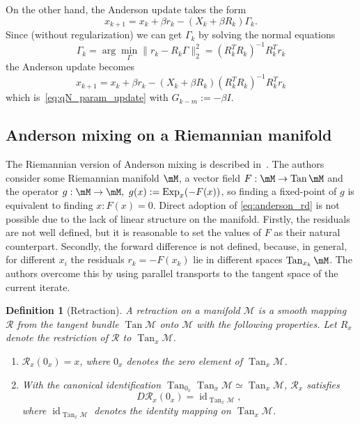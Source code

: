 \documentclass{article} %
\newtheorem{definition}{Definition}[section]
\numberwithin{equation}{subsection}
\numberwithin{theorem}{section}
\newcommand{\cR}{\mathcal{R}}
\newcommand{\rExp}{\operatorname{Exp}}
\begin{document}
    On the other hand, the Anderson update takes the form
    \begin{equation*}
        x_{k+1} = x_k + \beta r_k - (X_k + \beta R_k)\Gamma_k.
    \end{equation*}
    Since (without regularization) we can get $\Gamma_k$ by solving the normal equations
    \[
        \Gamma_k = \arg \min_\Gamma \|r_k - R_k\Gamma\|_2^2 = (R_k^T R_k)^{-1}R_k^T r_k
    \] 
    the Anderson update becomes
    \begin{equation*}
        x_{k+1} = x_k + \beta r_k - (X_k +\beta R_k)(R^T_k R_k)^{-1}R^T_k r_k 
    \end{equation*}
    which is~\eqref{eq:qN_param_update} with $G_{k-m} := - \beta I$.


\subsection{Anderson mixing on a Riemannian manifold}
        The Riemannian version of Anderson mixing is described in~\cite{li2023riemannian}.
        The authors consider some Riemannian manifold $\mM$, a vector field $F: \mM \to \operatorname{Tan}\mM$ and the operator $g: \mM \to \mM,\ g(x) := \rExp_x(-F(x))$, so finding a fixed-point of $g$ is equivalent to finding $x: F(x) = 0$.
        Direct adoption of \eqref{eq:anderson_rd} is not possible due to the lack of linear structure on the manifold.
        Firstly, the residuals are not well defined, but it is reasonable to  set the values of $F$ as their natural counterpart.
        Secondly, the forward difference is not defined, because, in general, for different $x_i$ the residuals $r_k = -F(x_k)$ lie in different spaces $\operatorname{Tan}_{x_k}\mM$.
        The authors overcome this by using parallel transports to the tangent space of the current iterate. 
        \begin{definition}[Retraction]
            A retraction on a manifold $\mathcal{M}$ is a smooth mapping $\cR$ from the tangent bundle $\operatorname{Tan}\mathcal{M}$ onto $\mathcal{M}$ with the following properties. Let $R_x$ denote the restriction of $\cR$ to $\operatorname{Tan}_x\mathcal{M}$.
            \begin{enumerate}
            \item $\cR_x(0_x) = x$, where $0_x$ denotes the zero element of $\operatorname{Tan}_x\mathcal{M}$.
            \item With the canonical identification $\operatorname{Tan}_{0_x}\operatorname{Tan}_x\mathcal{M} \simeq \operatorname{Tan}_x\mathcal{M}$, $\cR_x$ satisfies
            \[
                D \cR_x(0_x) = \operatorname{id}_{\operatorname{Tan}_x\mathcal{M}},
            \]
            where $\operatorname{id}_{\operatorname{Tan}_x\mathcal{M}}$ denotes the identity mapping on $\operatorname{Tan}_x\mathcal{M}$.
            \end{enumerate}
        \end{definition}
\end{document}
